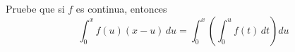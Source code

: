 \item Pruebe que si $f$ es continua, entonces
    \[ \int_{0}^{x} f(u)(x - u) \, du = \int_{0}^{x} \left( \int_{0}^{u} f(t) \, dt \right) du \]
